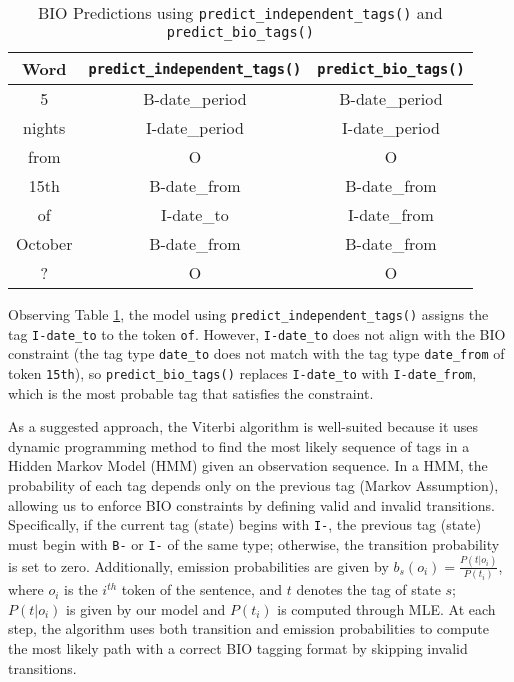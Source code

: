 \documentclass[11pt,a4paper]{article}
\begin{document}
\begin{table}[h!]
    \centering
    \begin{tabular}{|c|c|c|}
        \hline
        \textbf{Word} & \texttt{predict\_independent\_tags()} &\texttt{predict\_bio\_tags()} \\
        \hline
        5       & B-date\_period & B-date\_period\\
        nights  & I-date\_period & I-date\_period\\
        from    & O & O\\
        15th    & B-date\_from & B-date\_from\\
        of      & I-date\_to & I-date\_from\\
        October & B-date\_from & B-date\_from\\
        ?       & O & O\\
        \hline
    \end{tabular}
    
    \caption{BIO Predictions using \texttt{predict\_independent\_tags()} and \texttt{predict\_bio\_tags()}}
    \label{fig3}
\end{table}

Observing Table \ref{fig3}, the model using
\texttt{predict\_independent\_tags()}
assigns the tag \texttt{I-date\_to} to the token \texttt{of}. However, \texttt{I-date\_to} does not align with the BIO constraint (the tag type \texttt{date\_to} does not match with the tag type \texttt{date\_from} of token \texttt{15th}), so
\texttt{predict\_bio\_tags()}
replaces \texttt{I-date\_to} with \texttt{I-date\_from}, which is the most probable tag that satisfies the constraint.

As a suggested approach, the Viterbi algorithm is well-suited because it uses dynamic programming method to find the most likely sequence of tags in a Hidden Markov Model (HMM) given an observation sequence. In a HMM, the probability of each tag depends only on the previous tag (Markov Assumption), allowing us to enforce BIO constraints by defining valid and invalid transitions. Specifically, if the current tag (state) begins with \texttt{I-}, the previous tag (state) must begin with \texttt{B-} or \texttt{I-} of the same type; otherwise, the transition probability is set to zero. Additionally, emission probabilities are given by $b_{s}(o_i) = \frac{P(t|o_i)}{P(t_i)}$, where $o_i$ is the $i^{th}$ token of the sentence, and $t$ denotes the tag of state $s$; $P(t|o_i)$ is given by our model and $P(t_i)$ is computed through MLE.
At each step, the algorithm uses both transition and emission probabilities to compute the most likely path with a correct BIO tagging format by skipping invalid transitions.
\end{document}
